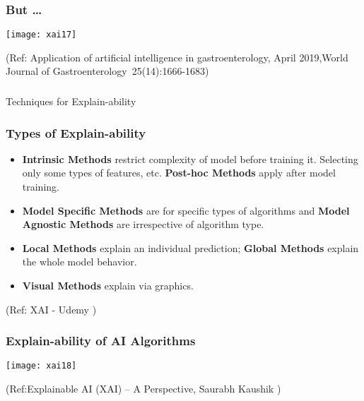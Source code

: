 \begin{frame}[fragile]\frametitle{But \ldots}
\begin{center}
\texttt{[image: xai17]}
\end{center}

\tiny{(Ref: Application of artificial intelligence in gastroenterology, April 2019,World Journal of Gastroenterology 25(14):1666-1683)
}
\end{frame}


\begin{frame}[fragile]\frametitle{}
\begin{center}
{\Large Techniques for Explain-ability}
\end{center}
\end{frame}

\begin{frame}[fragile]\frametitle{Types of Explain-ability}

\begin{itemize}
\item {\bf Intrinsic Methods} restrict complexity of model before training it. Selecting only some types of features, etc. {\bf Post-hoc Methods} apply after model training.
\item {\bf Model Specific Methods} are for specific types of algorithms and {\bf Model Agnostic Methods} are irrespective of algorithm type.
\item {\bf Local Methods} explain an individual prediction; {\bf Global Methods} explain the whole model behavior.
\item {\bf Visual Methods} explain via graphics.
\end{itemize}

\tiny{(Ref: XAI - Udemy  )}

\end{frame}

\begin{frame}[fragile]\frametitle{Explain-ability of AI Algorithms}
\begin{center}
\texttt{[image: xai18]}
\end{center}

\tiny{(Ref:Explainable AI (XAI) – A Perspective, Saurabh Kaushik  )}


\end{frame}


